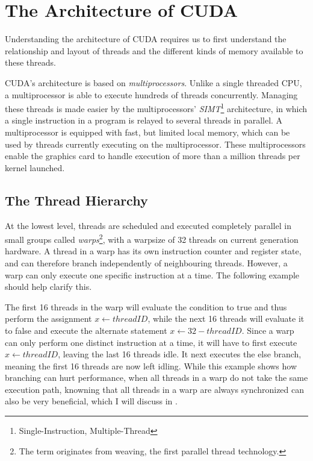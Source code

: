 \section{The Architecture of CUDA}

Understanding the architecture of CUDA requires us to first understand the
relationship and layout of threads and the different kinds of memory available
to these threads.

CUDA's architecture is based on \textit{multiprocessors}. Unlike a single
threaded CPU, a multiprocessor is able to execute hundreds of threads
concurrently. Managing these threads is made easier by the multiprocessors'
\textit{SIMT}\footnote{Single-Instruction, Multiple-Thread} architecture, in
which a single instruction in a program is relayed to several threads in
parallel. A multiprocessor is equipped with fast, but limited local memory,
which can be used by threads currently executing on the multiprocessor. These
multiprocessors enable the graphics card to handle execution of more than a
million threads per kernel launched.


\subsection{The Thread Hierarchy}\label{sec:threadHierarchy}



At the lowest level, threads are scheduled and executed completely parallel in
small groups called \textit{warps}\footnote{The term originates from weaving,
  the first parallel thread technology.}, with a warpsize of 32
threads on current generation hardware. A thread in a warp has its own
instruction counter and register state, and can therefore branch independently
of neighbouring threads. However, a warp can only execute one specific
instruction at a time. The following example should help clarify this.

\begin{algorithmic}
  \ELSE
  \ENDIF
\end{algorithmic}


The first 16 threads in the warp will evaluate the condition to true and thus
perform the assignment $x \leftarrow threadID$, while the next 16 threads will
evaluate it to false and execute the alternate statement $x \leftarrow 32 -
threadID$. Since a warp can only perform one distinct instruction at a time, it
will have to first execute $x \leftarrow threadID$, leaving the last 16 threads
idle. It next executes the else branch, meaning the first 16 threads are now
left idling. While this example shows how branching can hurt performance, when
all threads in a warp do not take the same execution path, knowning that all
threads in a warp are always synchronized can also be very beneficial, which I
will discuss in .

